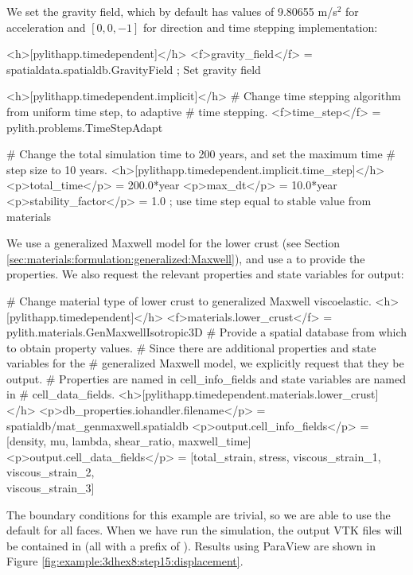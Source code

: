 We set the gravity field, which by default has values of 9.80655
m/s$^2$ for acceleration and $\left[0,0,-1\right]$
for direction and time stepping implementation:
\begin{cfg}
<h>[pylithapp.timedependent]</h>
<f>gravity_field</f> = spatialdata.spatialdb.GravityField ; Set gravity field

<h>[pylithapp.timedependent.implicit]</h>
# Change time stepping algorithm from uniform time step, to adaptive
# time stepping.
<f>time_step</f> = pylith.problems.TimeStepAdapt

# Change the total simulation time to 200 years, and set the maximum time
# step size to 10 years.
<h>[pylithapp.timedependent.implicit.time_step]</h>
<p>total_time</p> = 200.0*year
<p>max_dt</p> = 10.0*year
<p>stability_factor</p> = 1.0 ; use time step equal to stable value from materials
\end{cfg}

We use a generalized Maxwell model for the lower crust (see Section
\vref{sec:materials:formulation:generalized:Maxwell}), and use a  to
provide the properties. We also request the relevant properties and
state variables for output:
\begin{cfg}
# Change material type of lower crust to generalized Maxwell viscoelastic.
<h>[pylithapp.timedependent]</h>
<f>materials.lower_crust</f> = pylith.materials.GenMaxwellIsotropic3D
# Provide a spatial database from which to obtain property values.
# Since there are additional properties and state variables for the
# generalized Maxwell model, we explicitly request that they be output.
# Properties are named in cell\_info\_fields and state variables are named in
# cell\_data\_fields.
<h>[pylithapp.timedependent.materials.lower_crust]</h>
<p>db_properties.iohandler.filename</p> = spatialdb/mat\_genmaxwell.spatialdb
<p>output.cell_info_fields</p> = [density, mu, lambda, shear_ratio, maxwell_time]
<p>output.cell_data_fields</p> = [total_strain, stress, viscous_strain_1, viscous_strain_2, \\
  viscous_strain_3]
\end{cfg}
The boundary conditions for this example are trivial, so we are able
to use the default  for all faces. When we have
run the simulation, the output VTK files will be contained in 
(all with a prefix of ). Results using ParaView are
shown in Figure \vref{fig:example:3dhex8:step15:displacement}.

